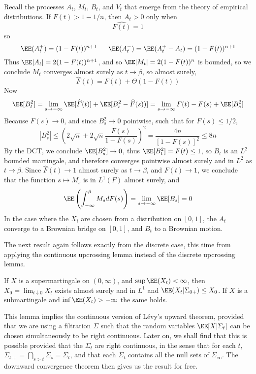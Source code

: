 \begin{example}
    Recall the processes $A_t$, $M_t$, $B_t$, and $V_t$ that emerge from the theory of empirical distributions. If $F(t) > 1 - 1/n$, then $A_t > 0$ only when
    \[ \widehat{F(t)} = 1 \]
    so
    \[ \EE(A_t^+) = (1 - F(t))^{n+1}\ \ \ \ \ \EE(A_t^-) = \EE(A_t^+ - A_t) = (1 - F(t))^{n+1} \]
    Thus $\EE|A_t| = 2(1 - F(t))^{n+1}$, and so $\EE|M_t| = 2(1 - F(t))^n$ is bounded, so we conclude $M_t$ converges almost surely as $t \to \beta$, so almost surely,
    \[ \widehat{F}(t) = F(t) + \Theta(1 - F(t)) \]
    Now
    \[ \EE[B_t^2] = \lim_{s \to -\infty} \EE[\widehat{F}(t)] + \EE[B_s^2 - \widehat{F}(s))] = \lim_{s \to -\infty} F(t) - F(s) + \EE[B_s^2] \]
    Because $F(s) \to 0$, and since $B_s^2 \to 0$ pointwise, such that for $F(s) \leq 1/2$,
    \[ |B_s^2| \leq \left( 2\sqrt{n} + 2\sqrt{n} \frac{F(s)}{1 - F(s)} \right)^2 = \frac{4n}{[1 - F(s)]^2} \leq 8n \]
    By the DCT, we conclude $\EE[B_s^2] \to 0$, thus $\EE[B_t^2] = F(t) \leq 1$, so $B_t$ is an $L^2$ bounded \cadlag martingale, and therefore converges pointwise almost surely and in $L^2$ as $t \to \beta$. Since $\widehat{F}(t) \to 1$ almost surely as $t \to \beta$, and $F(t) \to 1$, we conclude that the function $s \mapsto M_s$ is in $L^1(F)$ almost surely, and
    \[ \EE \left( \int_{-\infty}^\beta M_s dF(s) \right) = \lim_{s \to -\infty} \EE[B_s] = 0 \]
    In the case where the $X_i$ are chosen from a distribution on $[0,1]$, the $A_t$ converge to a Brownian bridge on $[0,1]$, and $B_t$ to a Brownian motion.
\end{example}

The next result again follows exactly from the discrete case, this time from applying the continuous upcrossing lemma instead of the discrete upcrossing lemma.

\begin{theorem}
    If $X$ is a \cadlag supermartingale on $(0,\infty)$, and $\sup \EE(X_t) < \infty$, then $X_0 = \lim_{t \downarrow 0} X_t$ exists almost surely and in $L^1$ and $\EE(X_t|\Sigma_{0+}) \leq X_0$. If $X$ is a submartingale and $\inf \EE(X_t) > -\infty$ the same holds.
\end{theorem}

This lemma implies the continuous version of L\'{e}vy's upward theorem, provided that we are using a filtration $\Sigma$ such that the random variables $\EE[X|\Sigma_t]$ can be chosen simultaneously to be right continuous. Later on, we shall find that this is possible provided that the $\Sigma_t$ are right continuous, in the sense that for each $t$, $\Sigma_{t+} = \bigcap_{s > t} \Sigma_s = \Sigma_t$, and that each $\Sigma_t$ contains all the null sets of $\Sigma_\infty$. The downward convergence theorem then gives us the result for free.

